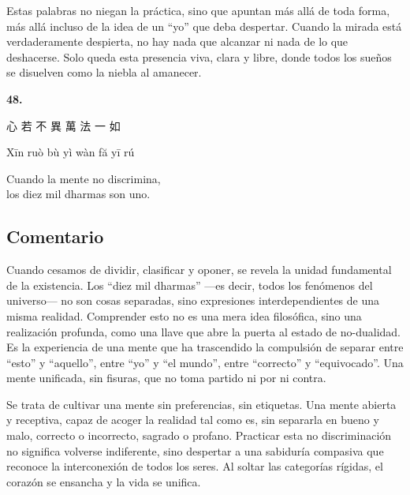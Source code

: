 \documentclass[
  a5paperpaper,
]{article}
\begin{document}
Estas palabras no niegan la práctica, sino que apuntan más allá de toda
forma, más allá incluso de la idea de un ``yo'' que deba despertar.
Cuando la mirada está verdaderamente despierta, no hay nada que alcanzar
ni nada de lo que deshacerse. Solo queda esta presencia viva, clara y
libre, donde todos los sueños se disuelven como la niebla al amanecer.

\hfill\break

\hypertarget{03}{}
\begin{verseblock}

\newpage

\begin{center}\textbf{48.}\end{center}

心 若 不 異 萬 法 一 如

Xīn ruò bù yì wàn fă yī rú

Cuando la mente no discrimina,\\
los diez mil dharmas son uno.

\end{verseblock}

\hfill\break

\hypertarget{comentario-47}{%
\subsection{Comentario}\label{comentario-47}}

Cuando cesamos de dividir, clasificar y oponer, se revela la unidad
fundamental de la existencia. Los ``diez mil dharmas'' ---es decir,
todos los fenómenos del universo--- no son cosas separadas, sino
expresiones interdependientes de una misma realidad. Comprender esto no
es una mera idea filosófica, sino una realización profunda, como una
llave que abre la puerta al estado de no-dualidad. Es la experiencia de
una mente que ha trascendido la compulsión de separar entre ``esto'' y
``aquello'', entre ``yo'' y ``el mundo'', entre ``correcto'' y
``equivocado''. Una mente unificada, sin fisuras, que no toma partido ni
por ni contra.

Se trata de cultivar una mente sin preferencias, sin etiquetas. Una
mente abierta y receptiva, capaz de acoger la realidad tal como es, sin
separarla en bueno y malo, correcto o incorrecto, sagrado o profano.
Practicar esta no discriminación no significa volverse indiferente, sino
despertar a una sabiduría compasiva que reconoce la interconexión de
todos los seres. Al soltar las categorías rígidas, el corazón se
ensancha y la vida se unifica.
\end{document}
